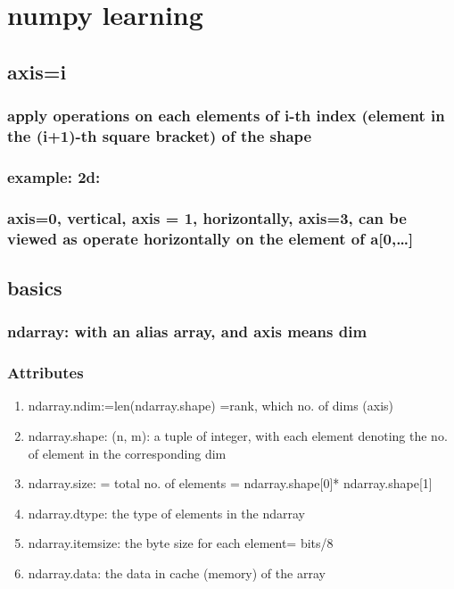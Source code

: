 \documentclass[11pt]{article}
\author{zhou yang}
\date{\today}
\title{}
\begin{document}
\tableofcontents

\section{numpy learning}
\label{sec:org7e823a9}

\subsection{axis=i}
\label{sec:org31f4c9c}
\subsubsection{apply operations on each elements of i-th index (element in the (i+1)-th square bracket) of the shape}
\label{sec:org6b7a434}
\subsubsection{example: 2d:}
\label{sec:org1df6e64}
\subsubsection{axis=0, vertical, axis = 1, horizontally, axis=3, can be viewed as operate horizontally on the element of a[0,\ldots{}]}
\label{sec:org0eca6a0}
\subsection{basics}
\label{sec:orgc2f0db6}
\subsubsection{ndarray: with an alias array, and axis means dim}
\label{sec:orgd0e81fb}
\subsubsection{Attributes}
\label{sec:org7b7e9c1}
\begin{enumerate}
\item ndarray.ndim:=len(ndarray.shape) =rank, which no. of dims (axis)
\label{sec:org3567539}
\item ndarray.shape: (n, m): a tuple of integer, with each element denoting the no. of element in the corresponding dim
\label{sec:orgc2504de}
\item ndarray.size: = total no. of elements = ndarray.shape[0]* ndarray.shape[1]
\label{sec:org8123884}
\item ndarray.dtype: the type of elements in the ndarray
\label{sec:org9a0e9d5}
\item ndarray.itemsize: the byte size for each element= bits/8
\label{sec:orge038762}
\item ndarray.data: the data in cache (memory) of the array
\label{sec:org9500467}
\end{enumerate}
\end{document}
